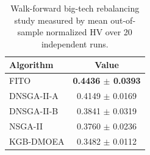 \begin{table}[!t]
\centering
\caption{Walk-forward big-tech rebalancing study measured by mean out-of-sample normalized HV over 20 independent runs.}
\label{tab:portfolio-mhv}
\begin{tabular}{lc}
\toprule
Algorithm & Value \\
\midrule
FITO & \textbf{0.4436 $\pm$ 0.0393} \\
DNSGA-II-A & 0.4149 $\pm$ 0.0169 \\
DNSGA-II-B & 0.3841 $\pm$ 0.0319 \\
NSGA-II & 0.3760 $\pm$ 0.0236 \\
KGB-DMOEA & 0.3482 $\pm$ 0.0112 \\
\bottomrule
\end{tabular}
\end{table}
